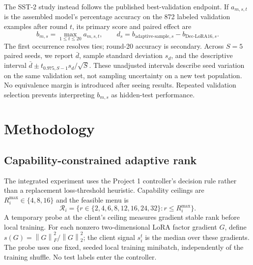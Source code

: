 \documentclass[11pt]{article}
\newcommand{\norm}[1]{\left\lVert#1\right\rVert}
\begin{document}
The SST-2 study instead follows the published best-validation endpoint. If $a_{m,s,t}$ is the assembled model's percentage accuracy on the 872 labeled validation examples after round $t$, its primary score and paired effect are
\begin{equation}
 b_{m,s}=\max_{1\le t\le20}a_{m,s,t},\qquad
 d_s=b_{\mathrm{adaptive\text{-}sample},s}-b_{\mathrm{Dec\text{-}LoRA16},s}.
 \label{eq:quantity-endpoint}
\end{equation}
The first occurrence resolves ties; round-20 accuracy is secondary. Across $S=5$ paired seeds, we report $\bar d$, sample standard deviation $s_d$, and the descriptive interval $\bar d\pm t_{0.975,S-1}s_d/\sqrt S$. These unadjusted intervals describe seed variation on the same validation set, not sampling uncertainty on a new test population. No equivalence margin is introduced after seeing results. Repeated validation selection prevents interpreting $b_{m,s}$ as hidden-test performance.

\section{Methodology}
\subsection{Capability-constrained adaptive rank}
The integrated experiment uses the Project 1 controller's decision rule rather than a replacement loss-threshold heuristic. Capability ceilings are $R_i^{\max}\in\{4,8,16\}$ and the feasible menu is
\begin{equation}
 \mathcal R_i=\{r\in\{2,4,6,8,12,16,24,32\}:r\le R_i^{\max}\}.
\end{equation}
A temporary probe at the client's ceiling measures gradient stable rank before local training. For each nonzero two-dimensional LoRA factor gradient $G$, define $s(G)=\norm{G}_F^2/\norm{G}_2^2$; the client signal $s_i^t$ is the median over these gradients. The probe uses one fixed, seeded local training minibatch, independently of the training shuffle. No test labels enter the controller.
\end{document}
